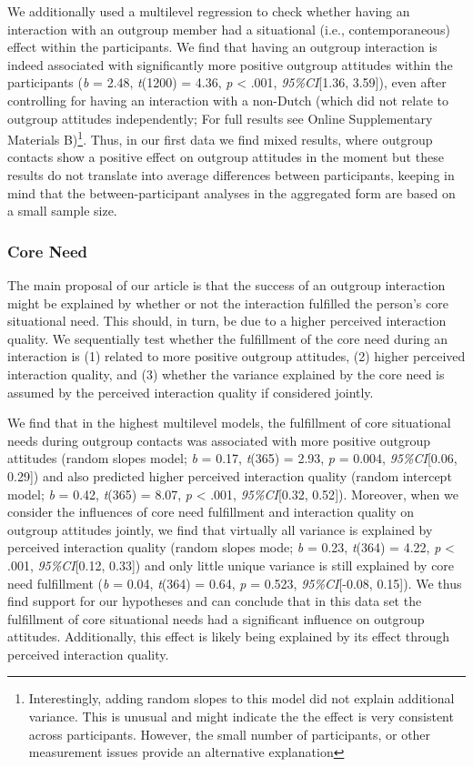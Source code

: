 We additionally used a multilevel regression to check whether having an
interaction with an outgroup member had a situational (i.e.,
contemporaneous) effect within the participants. We find that having an
outgroup interaction is indeed associated with significantly more
positive outgroup attitudes within the participants (\textit{b} = 2.48,
\textit{t}(1200) = 4.36, \textit{p} \textless{} .001,
\textit{95\%CI}{[}1.36, 3.59{]}), even after controlling for having an
interaction with a non-Dutch (which did not relate to outgroup attitudes
independently; For full results see Online Supplementary Materials
B)\footnote{Interestingly, adding random slopes to this model did not explain additional variance. This is unusual and might indicate the the effect is very consistent across participants. However, the small number of participants, or other measurement issues provide an alternative explanation}.
Thus, in our first data we find mixed results, where outgroup contacts
show a positive effect on outgroup attitudes in the moment but these
results do not translate into average differences between participants,
keeping in mind that the between-participant analyses in the aggregated
form are based on a small sample size.

\subsubsection{Core Need}

The main proposal of our article is that the success of an outgroup
interaction might be explained by whether or not the interaction
fulfilled the person's core situational need. This should, in turn, be
due to a higher perceived interaction quality. We sequentially test
whether the fulfillment of the core need during an interaction is (1)
related to more positive outgroup attitudes, (2) higher perceived
interaction quality, and (3) whether the variance explained by the core
need is assumed by the perceived interaction quality if considered
jointly.

We find that in the highest multilevel models, the fulfillment of core
situational needs during outgroup contacts was associated with more
positive outgroup attitudes (random slopes model; \textit{b} = 0.17,
\textit{t}(365) = 2.93, \textit{p} = 0.004, \textit{95\%CI}{[}0.06,
0.29{]}) and also predicted higher perceived interaction quality (random
intercept model; \textit{b} = 0.42, \textit{t}(365) = 8.07, \textit{p}
\textless{} .001, \textit{95\%CI}{[}0.32, 0.52{]}). Moreover, when we
consider the influences of core need fulfillment and interaction quality
on outgroup attitudes jointly, we find that virtually all variance is
explained by perceived interaction quality (random slopes mode;
\textit{b} = 0.23, \textit{t}(364) = 4.22, \textit{p} \textless{} .001,
\textit{95\%CI}{[}0.12, 0.33{]}) and only little unique variance is
still explained by core need fulfillment (\textit{b} = 0.04,
\textit{t}(364) = 0.64, \textit{p} = 0.523, \textit{95\%CI}{[}-0.08,
0.15{]}). We thus find support for our hypotheses and can conclude that
in this data set the fulfillment of core situational needs had a
significant influence on outgroup attitudes. Additionally, this effect
is likely being explained by its effect through perceived interaction
quality.

